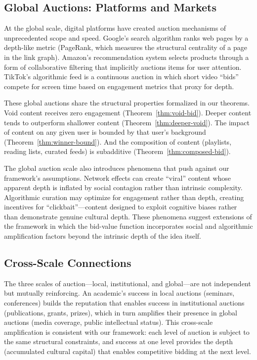 \subsection{Global Auctions: Platforms and Markets}

At the global scale, digital platforms have created auction mechanisms
of unprecedented scope and speed.  Google's search algorithm ranks
web pages by a depth-like metric (PageRank, which measures the
structural centrality of a page in the link graph).  Amazon's
recommendation system selects products through a form of collaborative
filtering that implicitly auctions items for user attention.  TikTok's
algorithmic feed is a continuous auction in which short video ``bids''
compete for screen time based on engagement metrics that proxy for depth.

These global auctions share the structural properties formalized in our
theorems.  Void content receives zero engagement
(Theorem~\ref{thm:void-bid}).  Deeper content tends to outperform
shallower content (Theorem~\ref{thm:deeper-void}).  The impact of
content on any given user is bounded by that user's background
(Theorem~\ref{thm:winner-bound}).  And the composition of content
(playlists, reading lists, curated feeds) is subadditive
(Theorem~\ref{thm:composed-bid}).

The global auction scale also introduces phenomena that push against our
framework's assumptions.  Network effects can create ``viral'' content
whose apparent depth is inflated by social contagion rather than
intrinsic complexity.  Algorithmic curation may optimize for engagement
rather than depth, creating incentives for ``clickbait''---content
designed to exploit cognitive biases rather than demonstrate genuine
cultural depth.  These phenomena suggest extensions of the framework
in which the bid-value function incorporates social and algorithmic
amplification factors beyond the intrinsic depth of the idea itself.

\subsection{Cross-Scale Connections}

The three scales of auction---local, institutional, and global---are not
independent but mutually reinforcing.  An academic's success in local
auctions (seminars, conferences) builds the reputation that enables
success in institutional auctions (publications, grants, prizes), which
in turn amplifies their presence in global auctions (media coverage,
public intellectual status).  This cross-scale amplification is consistent
with our framework: each level of auction is subject to the same
structural constraints, and success at one level provides the depth
(accumulated cultural capital) that enables competitive bidding at the
next level.

